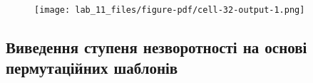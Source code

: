 \documentclass[
  letterpaper,
]{report}
\begin{document}
\begin{figure}[H]

{\centering \texttt{[image: lab\_11\_files/figure-pdf/cell-32-output-1.png]}

}

\end{figure}

\hypertarget{ux432ux438ux432ux435ux434ux435ux43dux43dux44f-ux441ux442ux443ux43fux435ux43dux44f-ux43dux435ux437ux432ux43eux440ux43eux442ux43dux43eux441ux442ux456-ux43dux430-ux43eux441ux43dux43eux432ux456-ux43fux435ux440ux43cux443ux442ux430ux446ux456ux439ux43dux438ux445-ux448ux430ux431ux43bux43eux43dux456ux432}{%
\subsection{Виведення ступеня незворотності на основі пермутаційних
шаблонів}\label{ux432ux438ux432ux435ux434ux435ux43dux43dux44f-ux441ux442ux443ux43fux435ux43dux44f-ux43dux435ux437ux432ux43eux440ux43eux442ux43dux43eux441ux442ux456-ux43dux430-ux43eux441ux43dux43eux432ux456-ux43fux435ux440ux43cux443ux442ux430ux446ux456ux439ux43dux438ux445-ux448ux430ux431ux43bux43eux43dux456ux432}}
\end{document}
